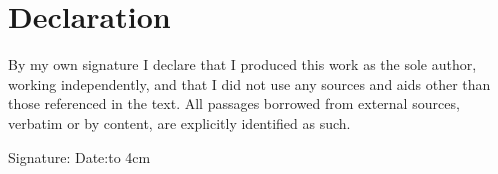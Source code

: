 \chapter*{Declaration}

By my own signature I declare that I produced this work as the sole author, working independently, and that I did not use any sources and aids other than those referenced in the text.
All passages borrowed from external sources, verbatim or by content, are explicitly identified as such.

\vspace{2cm}
Signature:\dotfill
Date:\hbox to 4cm{\dotfill}
